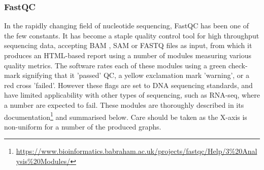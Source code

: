 \subsubsection{FastQC}
In the rapidly changing field of nucleotide sequencing, FastQC \citep{andrews2010fastqc} has been one of the few constants. It has become a staple quality control tool for high throughput sequencing data, accepting BAM \citep{BAM}, SAM \citep{li2009sequence} or FASTQ files as input, from which it produces an HTML-based report using a number of modules measuring various quality metrics. The software rates each of these modules using a green check-mark signifying that it 'passed' QC, a yellow exclamation mark 'warning', or a red cross 'failed'. However these flags are set to DNA sequencing standards, and have limited applicability with other types of sequencing, such as RNA-seq, where a number are expected to fail. These modules are thoroughly described in its documentation\footnote{\url{https://www.bioinformatics.babraham.ac.uk/projects/fastqc/Help/3\%20Analysis\%20Modules/}} and summarised below. Care should be taken as the X-axis is non-uniform for a number of the produced graphs.

